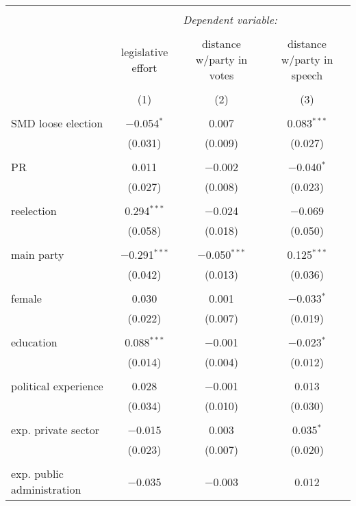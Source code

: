 \documentclass{article}
\begin{document}
\begin{table}[!htbp] \centering 
  \caption{} 
  \label{} 
\begin{tabular}{@{\extracolsep{5pt}}lccc} 
\\[-1.8ex]\hline 
\hline \\[-1.8ex] 
 & \multicolumn{3}{c}{\textit{Dependent variable:}} \\ 
\cline{2-4} 
\\[-1.8ex] & legislative effort & distance w/party in votes & distance w/party in speech \\ 
\\[-1.8ex] & (1) & (2) & (3)\\ 
\hline \\[-1.8ex] 
 SMD loose election & $-$0.054$^{*}$ & 0.007 & 0.083$^{***}$ \\ 
  & (0.031) & (0.009) & (0.027) \\ 
  & & & \\ 
 PR & 0.011 & $-$0.002 & $-$0.040$^{*}$ \\ 
  & (0.027) & (0.008) & (0.023) \\ 
  & & & \\ 
 reelection & 0.294$^{***}$ & $-$0.024 & $-$0.069 \\ 
  & (0.058) & (0.018) & (0.050) \\ 
  & & & \\ 
 main party & $-$0.291$^{***}$ & $-$0.050$^{***}$ & 0.125$^{***}$ \\ 
  & (0.042) & (0.013) & (0.036) \\ 
  & & & \\ 
 female & 0.030 & 0.001 & $-$0.033$^{*}$ \\ 
  & (0.022) & (0.007) & (0.019) \\ 
  & & & \\ 
 education & 0.088$^{***}$ & $-$0.001 & $-$0.023$^{*}$ \\ 
  & (0.014) & (0.004) & (0.012) \\ 
  & & & \\ 
 political experience & 0.028 & $-$0.001 & 0.013 \\ 
  & (0.034) & (0.010) & (0.030) \\ 
  & & & \\ 
 exp. private sector & $-$0.015 & 0.003 & 0.035$^{*}$ \\ 
  & (0.023) & (0.007) & (0.020) \\ 
  & & & \\ 
 exp. public administration & $-$0.035 & $-$0.003 & 0.012 \\ 

\end{tabular}
\end{table}
\end{document}
